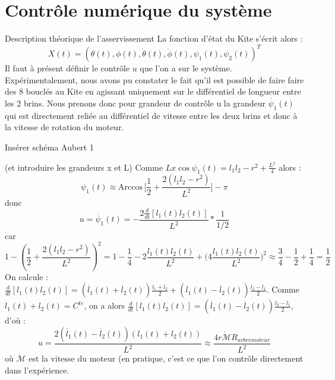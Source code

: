 \documentclass[a4paper,12pt]{article}
\newcounter{partie}
\newcounter{sous-partie}
\newenvironment{partie}[1]
{
\section{#1}
}
{

}
\newenvironment{sous-partie}[1]
{
\subsection{#1}
}
{

}
\renewcommand{\arccos}{\mathrm{Arccos}\,}
\begin{document}
\begin{partie}{Contrôle numérique du système}
\begin{sous-partie}{Description théorique de l'asservissement}
\newline
La fonction d'état du Kite s'écrit alors :
$$X(t)=(\theta(t),\phi(t),\dot{\theta}(t),\dot{\phi}(t),\psi_1(t), \psi_2(t))^T$$
Il faut à présent définir le contrôle $u$ que l'on a sur le système. Expérimentalement, nous avons pu constater le fait qu'il est possible de faire faire des 8 bouclés au Kite en agissant uniquement sur le différentiel de longueur entre les 2 brins. Nous prenons donc pour grandeur de contrôle u la grandeur $\dot{\psi_1}(t)$ qui est directement reliée au différentiel de vitesse entre les deux brins et donc à la vitesse de rotation du moteur.
\newline
\begin{huge}
Insérer schéma Aubert 1 
\end{huge}
(et introduire les grandeurs x et L)
\newline
Comme $L x \cos \psi_1(t) = l_1 l_2 -r^2 +\frac{L^2}{4}$ alors : $$\psi_1(t) \approx \arccos \big[\frac{1}{2} + \frac{2(l_1 l_2-r^2)}{L^2}\big]-\pi$$ donc
$$u = \dot{\psi_1}(t)= -\frac{2\frac{d}{dt}[l_1(t) l_2(t)]}{L^2}* \frac{1}{1/2}$$ car $$1-(\frac{1}{2} + \frac{2(l_1 l_2-r^2)}{L^2})^2 = 1-\frac{1}{4} - 2 \frac{l_1(t)l_2(t)}{L^2} + \big(4 \frac{l_1(t)l_2(t)}{L^2}\big)^2 \approx \frac{3}{4}-\frac{1}{2} + \frac{1}{4}= \frac{1}{2}$$
On calcule : $\frac{d}{dt}[l_1(t) l_2(t)] = (\dot{l_1}(t)+ \dot{l_2}(t))\frac{l_1 + l_2}{2}+(\dot{l_1}(t)- \dot{l_2}(t))\frac{l_2 - l_1}{2}$. Comme $l_1(t)+l_2(t)=C^{te}$, on a alors $\frac{d}{dt}[l_1(t) l_2(t)]= (\dot{l_1}(t)- \dot{l_2}(t))\frac{l_2 - l_1}{2}$, d'où :
$$u =  \frac{2 (\dot{l_1}(t)-\dot{l_2}(t))(l_1(t)+l_2(t))}{L^2} \approx \frac{4 r \dot{\mathcal{M}} R_{arbre moteur}}{L^2}$$ où $\dot{\mathcal{M}}$ est la vitesse du moteur (en pratique, c'est ce que l'on contrôle directement dans l'expérience.




\end{sous-partie}
\end{partie}
\end{document}
